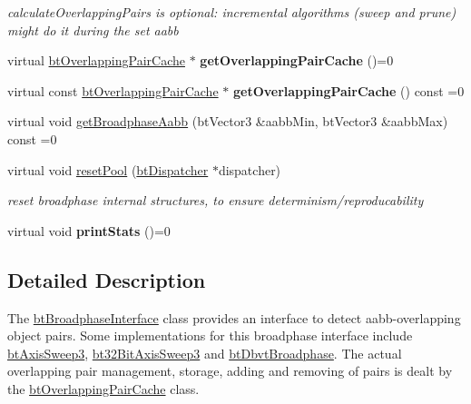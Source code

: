 \begin{DoxyCompactItemize}
\begin{DoxyCompactList}\small\item\em calculate\+Overlapping\+Pairs is optional\+: incremental algorithms (sweep and prune) might do it during the set aabb \end{DoxyCompactList}\item 
\mbox{\label{classbtBroadphaseInterface_ab571b271322bd5a114fe737b30df5b52}} 
virtual \hyperlink{classbtOverlappingPairCache}{bt\+Overlapping\+Pair\+Cache} $\ast$ {\bfseries get\+Overlapping\+Pair\+Cache} ()=0
\item 
\mbox{\label{classbtBroadphaseInterface_a80c39996491df3b0a5bf927d5837c966}} 
virtual const \hyperlink{classbtOverlappingPairCache}{bt\+Overlapping\+Pair\+Cache} $\ast$ {\bfseries get\+Overlapping\+Pair\+Cache} () const =0
\item 
virtual void \hyperlink{classbtBroadphaseInterface_ab5af9e26414f5a72a76040b8fab4d9e2}{get\+Broadphase\+Aabb} (bt\+Vector3 \&aabb\+Min, bt\+Vector3 \&aabb\+Max) const =0
\item 
\mbox{\label{classbtBroadphaseInterface_a8135b10b29bced0b1c62ba6be060dc29}} 
virtual void \hyperlink{classbtBroadphaseInterface_a8135b10b29bced0b1c62ba6be060dc29}{reset\+Pool} (\hyperlink{classbtDispatcher}{bt\+Dispatcher} $\ast$dispatcher)
\begin{DoxyCompactList}\small\item\em reset broadphase internal structures, to ensure determinism/reproducability \end{DoxyCompactList}\item 
\mbox{\label{classbtBroadphaseInterface_aa8aa8cfee6492f59c54ca1827a072554}} 
virtual void {\bfseries print\+Stats} ()=0
\end{DoxyCompactItemize}


\subsection{Detailed Description}
The \hyperlink{classbtBroadphaseInterface}{bt\+Broadphase\+Interface} class provides an interface to detect aabb-\/overlapping object pairs. Some implementations for this broadphase interface include \hyperlink{classbtAxisSweep3}{bt\+Axis\+Sweep3}, \hyperlink{classbt32BitAxisSweep3}{bt32\+Bit\+Axis\+Sweep3} and \hyperlink{structbtDbvtBroadphase}{bt\+Dbvt\+Broadphase}. The actual overlapping pair management, storage, adding and removing of pairs is dealt by the \hyperlink{classbtOverlappingPairCache}{bt\+Overlapping\+Pair\+Cache} class. 

